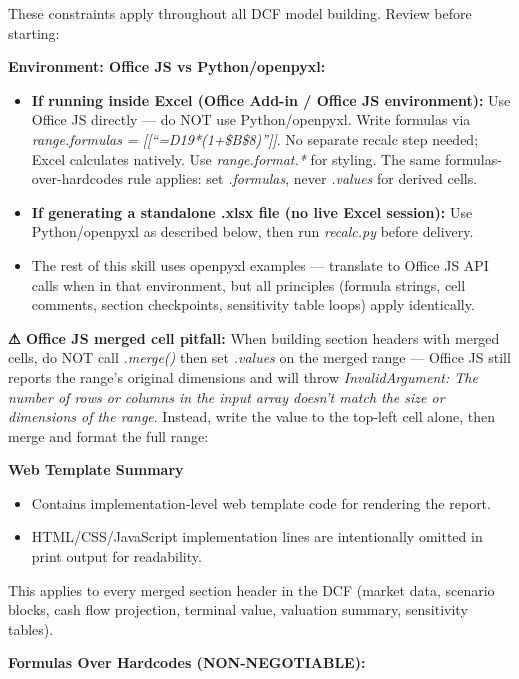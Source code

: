 \documentclass[11pt]{article}
\begin{document}
These constraints apply throughout all DCF model building. Review before starting:


\textbf{Environment: Office JS vs Python/openpyxl:}

\begin{itemize}[leftmargin=*,itemsep=2pt,topsep=2pt]
\item {} \textbf{If running inside Excel (Office Add-in / Office JS environment):} Use Office JS directly — do NOT use Python/openpyxl. Write formulas via \emph{range.formulas = [[``=D19*(1+\$B\$8)'']]}. No separate recalc step needed; Excel calculates natively. Use \emph{range.format.*} for styling. The same formulas-over-hardcodes rule applies: set \emph{.formulas}, never \emph{.values} for derived cells.
\item {} \textbf{If generating a standalone .xlsx file (no live Excel session):} Use Python/openpyxl as described below, then run \emph{recalc.py} before delivery.
\item {} The rest of this skill uses openpyxl examples — translate to Office JS API calls when in that environment, but all principles (formula strings, cell comments, section checkpoints, sensitivity table loops) apply identically.
\end{itemize}

\textbf{⚠ Office JS merged cell pitfall:} When building section headers with merged cells, do NOT call \emph{.merge()} then set \emph{.values} on the merged range — Office JS still reports the range's original dimensions and will throw \emph{InvalidArgument: The number of rows or columns in the input array doesn't match the size or dimensions of the range}. Instead, write the value to the top-left cell alone, then merge and format the full range:


\textbf{Web Template Summary}
\begin{itemize}[leftmargin=*,itemsep=2pt,topsep=2pt]
\item {} Contains implementation-level web template code for rendering the report.
\item {} HTML/CSS/JavaScript implementation lines are intentionally omitted in print output for readability.
\end{itemize}

This applies to every merged section header in the DCF (market data, scenario blocks, cash flow projection, terminal value, valuation summary, sensitivity tables).


\textbf{Formulas Over Hardcodes (NON-NEGOTIABLE):}
\end{document}
